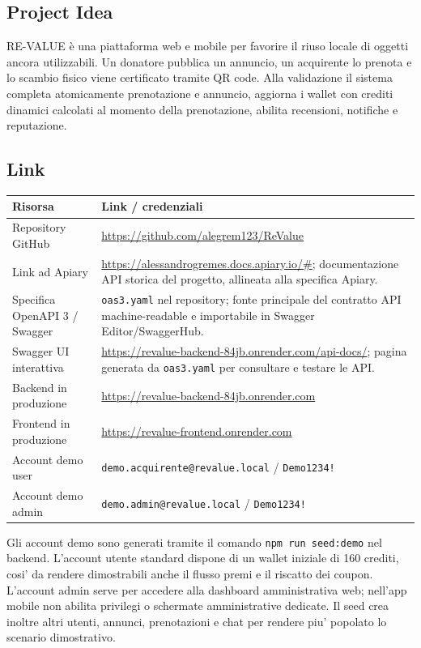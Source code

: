 \documentclass[11pt,a4paper]{article}
\newcommand{\code}[1]{\texttt{#1}}
\begin{document}
\subsection{Project Idea}

RE-VALUE è una piattaforma web e mobile per favorire il riuso locale di oggetti ancora utilizzabili.
Un donatore pubblica un annuncio, un acquirente lo prenota e lo scambio fisico viene certificato tramite QR code.
Alla validazione il sistema completa atomicamente prenotazione e annuncio, aggiorna i wallet con crediti dinamici calcolati al momento della prenotazione, abilita recensioni, notifiche e reputazione.

\subsection{Link}

\begin{longtable}{L{4.2cm}L{10.5cm}}
\toprule
\textbf{Risorsa} & \textbf{Link / credenziali} \\
\midrule
\endhead
\bottomrule
\endfoot
Repository GitHub & \url{https://github.com/alegrem123/ReValue} \\
Link ad Apiary & \url{https://alessandrogremes.docs.apiary.io/#}; documentazione API storica del progetto, allineata alla specifica Apiary. \\
Specifica OpenAPI 3 / Swagger & \code{oas3.yaml} nel repository; fonte principale del contratto API machine-readable e importabile in Swagger Editor/SwaggerHub. \\
Swagger UI interattiva & \url{https://revalue-backend-84jb.onrender.com/api-docs/}; pagina generata da \code{oas3.yaml} per consultare e testare le API. \\
Backend in produzione & \url{https://revalue-backend-84jb.onrender.com} \\
Frontend in produzione & \url{https://revalue-frontend.onrender.com} \\
Account demo user & \code{demo.acquirente@revalue.local} / \code{Demo1234!} \\
Account demo admin & \code{demo.admin@revalue.local} / \code{Demo1234!} \\
\end{longtable}

Gli account demo sono generati tramite il comando \code{npm run seed:demo} nel backend. L'account utente standard dispone di un wallet iniziale di 160 crediti, cosi' da rendere dimostrabili anche il flusso premi e il riscatto dei coupon. L'account admin serve per accedere alla dashboard amministrativa web; nell'app mobile non abilita privilegi o schermate amministrative dedicate. Il seed crea inoltre altri utenti, annunci, prenotazioni e chat per rendere piu' popolato lo scenario dimostrativo.
\end{document}
